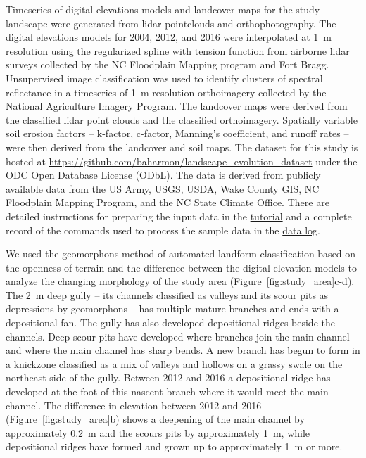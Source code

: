 \documentclass[gmd, manuscript]{copernicus}
\begin{document}
Timeseries of digital elevations models 
and landcover maps for the study landscape
were generated from lidar pointclouds and orthophotography.
The digital elevations models for 2004, 2012, and 2016
were interpolated at 1~\unit{m} resolution
using the regularized spline with tension function \citep{Mitasova1993,Mitasova2005}
from airborne lidar surveys 
collected by the NC Floodplain Mapping program and Fort Bragg. 
%
Unsupervised image classification 
was used to identify clusters of spectral reflectance
in a timeseries of 1~\unit{m} resolution orthoimagery 
collected by the National Agriculture Imagery Program.
The landcover maps were derived from the
classified lidar point clouds and the classified orthoimagery.
Spatially variable soil erosion factors 
-- k-factor, c-factor, Manning's coefficient, and runoff rates --
were then derived from the landcover and soil maps.
The dataset for this study is hosted at 
\url{https://github.com/baharmon/landscape\_evolution_dataset}
under the ODC Open Database License (ODbL).
The data is derived from publicly available data from
the US Army, USGS, USDA, Wake County GIS, NC Floodplain
Mapping Program, and the NC State Climate Office.
There are detailed instructions for preparing the input data in the 
\href{https://github.com/baharmon/landscape_evolution/blob/master/tutorial.md}{tutorial}
and a complete record of the commands used to process the sample data in the
\href{https://github.com/baharmon/landscape_evolution_dataset/blob/master/nc_spm_evolution/DATA.md}{data log}.

We used the geomorphons method 
of automated landform classification
based on the openness of terrain \citep{Jasiewicz2013}
and the difference between the digital elevation models 
to analyze the changing morphology of the study area
(Figure~\ref{fig:study_area}c-d). 
%
The 2~\unit{m} deep gully -- 
its channels classified as valleys and 
its scour pits as depressions by geomorphons -- 
has multiple mature branches
and ends with a depositional fan.
%
The gully has also developed 
depositional ridges beside the channels.
Deep scour pits have developed 
where branches join the main channel 
and where the main channel has sharp bends.
%
A new branch has begun to form 
in a knickzone classified as a mix of valleys and hollows
on a grassy swale on the northeast side of the gully.
Between 2012 and 2016 a depositional ridge
has developed at the foot of this nascent branch
where it would meet the main channel. 
%
The difference in elevation between 2012 and 2016
(Figure~\ref{fig:study_area}b)
shows a deepening of the main channel 
by approximately 0.2~\unit{m} 
and the scours pits
by approximately 1~\unit{m},
while depositional ridges have formed and grown up to
approximately 1~\unit{m} or more.
\end{document}
